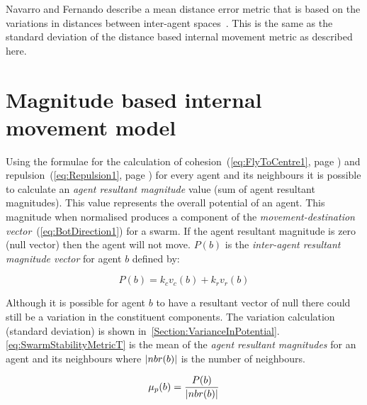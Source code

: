 Navarro and Fernando describe a mean distance error metric that is based on the variations in distances between inter-agent spaces~\cite{NIM:09}. This is the same as the standard deviation of the distance based internal movement metric as described here. 

\section{Magnitude based internal movement model}\label{Section:StabilityModel}
Using the formulae for the calculation of cohesion~(\autoref{eq:FlyToCentre1}, page \pageref{eq:FlyToCentre1}) and repulsion~(\autoref{eq:Repulsion1}, page \pageref{eq:Repulsion1}) for every agent and its neighbours it is possible to calculate an \textit{agent resultant magnitude} value (sum of agent resultant magnitudes). This value represents the overall potential of an agent. This magnitude when normalised produces a component of the \textit{movement-destination vector}~(\autoref{eq:BotDirection1}) for a swarm. If the agent resultant magnitude is zero (null vector) then the agent will not move. $P(b)$ is the \textit{inter-agent resultant magnitude vector} for agent $b$ defined by:

\begin{equation}
\label{eq:BotStabilityT}
P(b) = k_cv_c(b) + k_r v_r(b)
\end{equation}

Although it is possible for agent $b$ to have a resultant vector of null there could still be a variation in the constituent components. The variation calculation (standard deviation) is shown in~\autoref{Section:VarianceInPotential}. \autoref{eq:SwarmStabilityMetricT} is the mean of the \textit{agent resultant magnitudes} for an agent and its neighbours where $\vert{nbr(b)}\vert$ is the number of neighbours.

\begin{equation}
\label{eq:SwarmStabilityMetricT}
\mu_p(b) = \frac{P(b)}{\vert{nbr(b)}\vert}
\end{equation}


